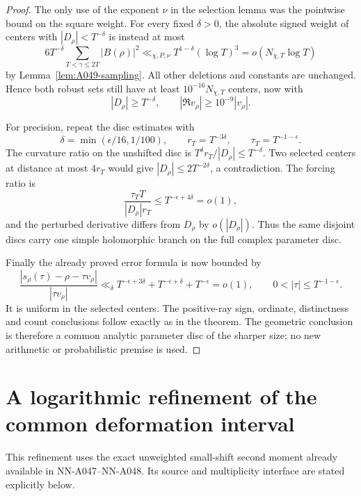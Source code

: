 \begin{proof}
The only use of the exponent \(\nu\) in the selection
lemma was the pointwise bound on the square weight.
For every fixed \(\delta>0\), the absolute signed weight
of centers with \(|D_\rho|<T^{-\delta}\) is instead at most
\[
 6T^{-\delta}\sum_{T<\gamma\le2T}|B(\rho)|^2
      \ll_{\chi,P,\nu}T^{1-\delta}(\log T)^3
                           =o(N_{\chi,T}\log T)
\]
by Lemma~\ref{lem:A049-sampling}. All other deletions and
constants are unchanged. Hence both robust sets still
have at least \(10^{-16}N_{\chi,T}\) centers, now with
\[
              |D_\rho|\ge T^{-\delta},\qquad
              |\Re v_\rho|\ge10^{-9}|v_\rho|.
\]

For precision, repeat the disc estimates with
\[
 \delta=\min(\epsilon/16,1/100),\qquad
 r_T=T^{-3\delta},\qquad \tau_T=T^{-1-\epsilon}.
\]
The curvature ratio on the unshifted disc is
\(T^\delta r_T/|D_\rho|\le T^{-\delta}\).
Two selected centers at distance at most \(4r_T\)
would give \(|D_\rho|\le2T^{-2\delta}\), a contradiction.
The forcing ratio is
\[
 \frac{\tau_T T}{|D_\rho|r_T}
                    \le T^{-\epsilon+4\delta}=o(1),
\]
and the perturbed derivative differs from \(D_\rho\)
by \(o(|D_\rho|)\). Thus the same disjoint discs carry
one simple holomorphic branch on the full complex
parameter disc.

Finally the already proved error formula is now bounded by
\[
 \frac{|s_\rho(\tau)-\rho-\tau v_\rho|}
      {|\tau v_\rho|}
 \ll_\delta T^{-\epsilon+3\delta}
             +T^{-\epsilon+\delta}+T^{-\epsilon}=o(1),
 \qquad 0<|\tau|\le T^{-1-\epsilon}.
\]
It is uniform in the selected centers. The positive-ray
sign, ordinate, distinctness and count conclusions follow
exactly as in the theorem. The geometric conclusion is
therefore a common analytic parameter disc of the sharper
size; no new arithmetic or probabilistic premise is used.
\end{proof}




\section{A logarithmic refinement of the common deformation interval}
\label{sec:A049-logarithmic-time}

This refinement uses the exact unweighted small-shift second
moment already available in NN-A047--NN-A048. Its source and
multiplicity interface are stated explicitly below.

